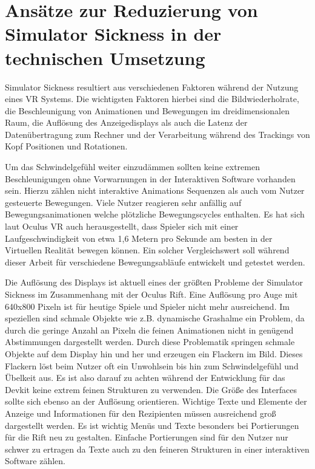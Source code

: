 \documentclass[pagesize, paper=a4, fontsize=12pt,titlepage=true, headings=small, headnosepline, abstractoff, liststotoc, nochapterprefix, plainheadsepline]{scrreprt}
\begin{document}
\section{Ansätze zur Reduzierung von Simulator Sickness in der technischen Umsetzung}
Simulator Sickness resultiert aus verschiedenen Faktoren während der Nutzung eines VR Systems. Die wichtigsten Faktoren hierbei sind die Bildwiederholrate, die Beschleunigung von Animationen und Bewegungen im dreidimensionalen Raum, die Auflösung des Anzeigedisplays als auch die Latenz der Datenübertragung zum Rechner und der Verarbeitung während des Trackings von Kopf Positionen und Rotationen. 

Um das Schwindelgefühl weiter einzudämmen sollten keine extremen Beschleunigungen ohne Vorwarnungen in der Interaktiven Software vorhanden sein. Hierzu zählen nicht interaktive Animations Sequenzen als auch vom Nutzer gesteuerte Bewegungen. Viele Nutzer reagieren sehr anfällig auf Bewegungsanimationen welche plötzliche Bewegungscycles enthalten. Es hat sich laut Oculus VR auch herausgestellt, dass Spieler sich mit einer Laufgeschwindigkeit von etwa 1,6 Metern pro Sekunde am besten in der Virtuellen Realität bewegen können. Ein solcher Vergleichswert soll während dieser Arbeit für verschiedene Bewegungsabläufe entwickelt und getestet werden.

Die Auflösung des Displays ist aktuell eines der größten Probleme der Simulator Sickness im Zusammenhang mit der Oculus Rift.  Eine Auflösung pro Auge mit 640x800 Pixeln ist für heutige Spiele und Spieler nicht mehr ausreichend. Im speziellen sind schmale Objekte wie z.B. dynamische Grashalme ein Problem, da durch die geringe Anzahl an Pixeln die feinen Animationen nicht in genügend Abstimmungen dargestellt werden. Durch diese Problematik springen schmale Objekte auf dem Display hin und her und erzeugen ein Flackern im Bild. Dieses Flackern löst beim Nutzer oft ein Unwohlsein bis hin zum Schwindelgefühl und Übelkeit aus. Es ist also darauf zu achten während der Entwicklung für das Devkit keine extrem feinen Strukturen zu verwenden. Die Größe des Interfaces sollte sich ebenso an der Auflösung orientieren. Wichtige Texte und Elemente der Anzeige und Informationen für den Rezipienten müssen ausreichend groß dargestellt werden. Es ist wichtig Menüs und Texte besonders bei Portierungen für die Rift neu zu gestalten. Einfache Portierungen sind für den Nutzer nur schwer zu ertragen da Texte auch zu den feineren Strukturen in einer interaktiven Software zählen.
\end{document}

